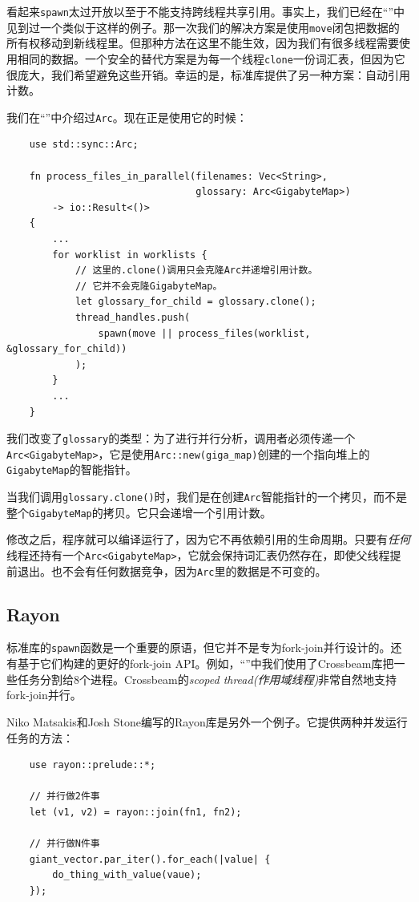看起来\texttt{spawn}太过开放以至于不能支持跨线程共享引用。事实上，我们已经在“”中见到过一个类似于这样的例子。那一次我们的解决方案是使用\texttt{move}闭包把数据的所有权移动到新线程里。但那种方法在这里不能生效，因为我们有很多线程需要使用相同的数据。一个安全的替代方案是为每一个线程\texttt{clone}一份词汇表，但因为它很庞大，我们希望避免这些开销。幸运的是，标准库提供了另一种方案：自动引用计数。

我们在“”中介绍过\texttt{Arc}。现在正是使用它的时候：
\begin{verbatim}
    use std::sync::Arc;

    fn process_files_in_parallel(filenames: Vec<String>,
                                 glossary: Arc<GigabyteMap>)
        -> io::Result<()>
    {
        ...
        for worklist in worklists {
            // 这里的.clone()调用只会克隆Arc并递增引用计数。
            // 它并不会克隆GigabyteMap。
            let glossary_for_child = glossary.clone();
            thread_handles.push(
                spawn(move || process_files(worklist, &glossary_for_child))
            );
        }
        ...
    }
\end{verbatim}

我们改变了\texttt{glossary}的类型：为了进行并行分析，调用者必须传递一个\texttt{Arc<GigabyteMap>}，它是使用\texttt{Arc::new(giga\_map)}创建的一个指向堆上的\texttt{GigabyteMap}的智能指针。

当我们调用\texttt{glossary.clone()}时，我们是在创建\texttt{Arc}智能指针的一个拷贝，而不是整个\texttt{GigabyteMap}的拷贝。它只会递增一个引用计数。

修改之后，程序就可以编译运行了，因为它不再依赖引用的生命周期。只要有\emph{任何}线程还持有一个\texttt{Arc<GigabyteMap>}，它就会保持词汇表仍然存在，即使父线程提前退出。也不会有任何数据竞争，因为\texttt{Arc}里的数据是不可变的。

\subsection{Rayon}

标准库的\texttt{spawn}函数是一个重要的原语，但它并不是专为fork-join并行设计的。还有基于它们构建的更好的fork-join API。例如，“”中我们使用了Crossbeam库把一些任务分割给8个进程。Crossbeam的\emph{scoped thread(作用域线程)}非常自然地支持fork-join并行。

Niko Matsakis和Josh Stone编写的Rayon库是另外一个例子。它提供两种并发运行任务的方法：
\begin{verbatim}
    use rayon::prelude::*;

    // 并行做2件事
    let (v1, v2) = rayon::join(fn1, fn2);

    // 并行做N件事
    giant_vector.par_iter().for_each(|value| {
        do_thing_with_value(vaue);
    });
\end{verbatim}

